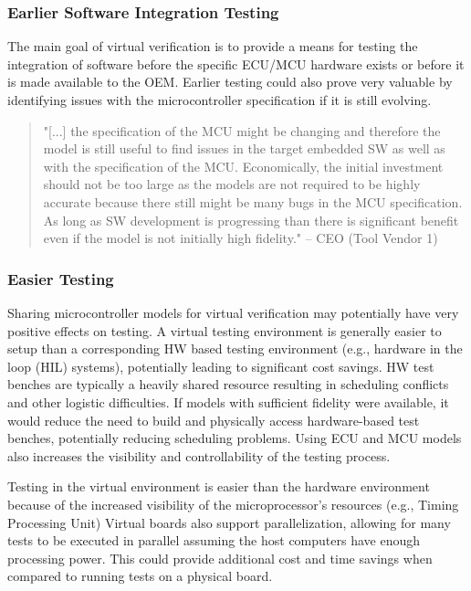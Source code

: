 \subsubsection{Earlier Software Integration Testing}
The main goal of virtual verification is to provide a means for testing the integration of software before the specific ECU/MCU hardware exists or before it is made available to the OEM.
Earlier testing could also prove very valuable by identifying issues with the microcontroller specification if it is still evolving.
\begin{quote}
"[...] the specification of the MCU might be changing and therefore the model is still useful to find issues in the target embedded SW as well as with the specification of the MCU. Economically, the initial investment should not be too large as the models are not required to be highly accurate because there still might be many bugs in the MCU specification. As long as SW development is progressing than there is significant benefit even if the model is not initially high fidelity."
-- CEO (Tool Vendor 1)
\end{quote}

\subsubsection{Easier Testing}
Sharing microcontroller models for virtual verification may potentially have very positive effects on testing. A virtual testing environment is generally easier to setup than a corresponding HW based testing environment (e.g., hardware in the loop (HIL) systems), potentially leading to significant cost savings. HW test benches are typically a heavily shared resource resulting in scheduling conflicts and other logistic difficulties. If models with sufficient fidelity were available, it would reduce the need to build and physically access hardware-based test benches, potentially reducing scheduling problems. Using ECU and MCU models also increases the visibility and controllability of the testing process.

Testing in the virtual environment is easier than the hardware environment because of the increased visibility of the microprocessor’s resources (e.g., Timing Processing Unit)
Virtual boards also support parallelization, allowing for many tests to be executed in parallel assuming the host computers have enough processing power. This could provide additional cost and time savings when compared to running tests on a physical board.


